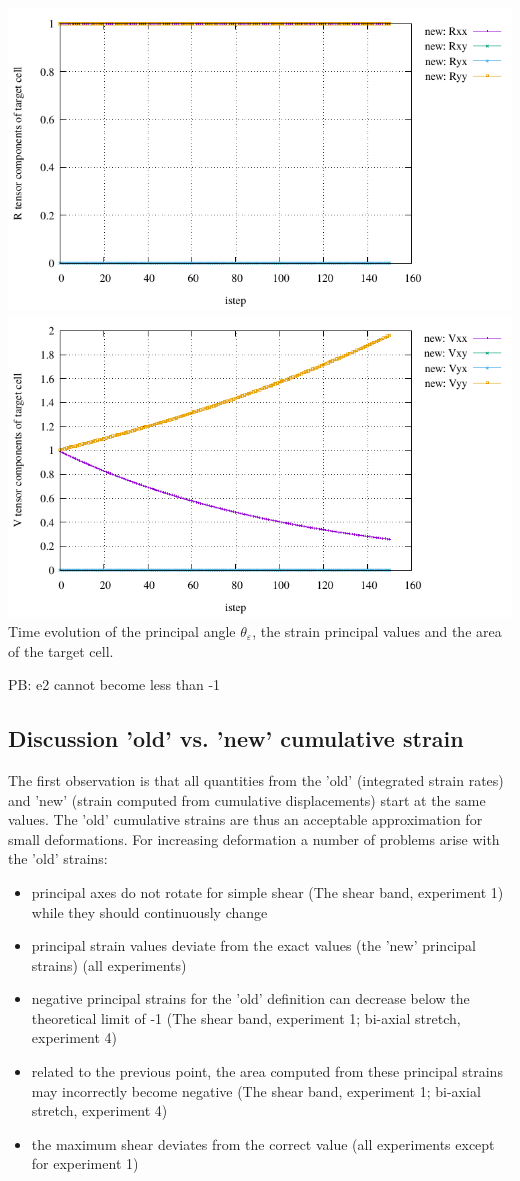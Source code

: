 \begin{center}
\includegraphics[width=9.cm]{python_codes/fieldstone_89/results/biaxial/R.pdf}
\includegraphics[width=9.cm]{python_codes/fieldstone_89/results/biaxial/V.pdf}\\
{\captionfont Time evolution of the principal angle $\theta_\varepsilon$, 
the strain principal values and the area of the target cell.}
\end{center}

PB: e2 cannot become less than -1 


\subsection*{Discussion 'old' vs. 'new' cumulative strain}

The first observation is that all quantities from the 'old' (integrated strain rates) and 'new' 
(strain computed from cumulative displacements) start at the same values. 
The 'old' cumulative strains are thus an acceptable approximation for small deformations. 
For increasing deformation a number of problems arise with the 'old' strains:

\begin{itemize}
\item principal axes do not rotate for simple shear (The shear band, experiment 1) while they should continuously change
\item principal strain values deviate from the exact values (the 'new' principal strains) (all experiments)
\item negative principal strains for the 'old' definition can decrease below the theoretical limit of -1 (The shear band, experiment 1; bi-axial stretch, experiment 4)
\item related to the previous point, the area computed from these principal strains may incorrectly become negative (The shear band, experiment 1;  bi-axial stretch, experiment 4)
\item the maximum shear deviates from the correct value (all experiments except for experiment 1)
\end{itemize}

